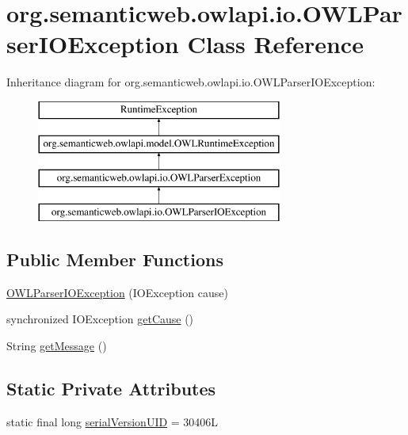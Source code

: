 \hypertarget{classorg_1_1semanticweb_1_1owlapi_1_1io_1_1_o_w_l_parser_i_o_exception}{\section{org.\-semanticweb.\-owlapi.\-io.\-O\-W\-L\-Parser\-I\-O\-Exception Class Reference}
\label{classorg_1_1semanticweb_1_1owlapi_1_1io_1_1_o_w_l_parser_i_o_exception}
}
Inheritance diagram for org.\-semanticweb.\-owlapi.\-io.\-O\-W\-L\-Parser\-I\-O\-Exception\-:\begin{figure}[H]
\begin{center}
\leavevmode
\includegraphics[height=4.000000cm]{classorg_1_1semanticweb_1_1owlapi_1_1io_1_1_o_w_l_parser_i_o_exception}
\end{center}
\end{figure}
\subsection*{Public Member Functions}
\begin{DoxyCompactItemize}
\item 
\hyperlink{classorg_1_1semanticweb_1_1owlapi_1_1io_1_1_o_w_l_parser_i_o_exception_a90b8e2fc5bef96d6669867fe3a56fdd2}{O\-W\-L\-Parser\-I\-O\-Exception} (I\-O\-Exception cause)
\item 
synchronized I\-O\-Exception \hyperlink{classorg_1_1semanticweb_1_1owlapi_1_1io_1_1_o_w_l_parser_i_o_exception_ac6a0f6ffe631550d80dce450484086eb}{get\-Cause} ()
\item 
String \hyperlink{classorg_1_1semanticweb_1_1owlapi_1_1io_1_1_o_w_l_parser_i_o_exception_a82fa38e19cffb2b64e7177cf26e6fd32}{get\-Message} ()
\end{DoxyCompactItemize}
\subsection*{Static Private Attributes}
\begin{DoxyCompactItemize}
\item 
static final long \hyperlink{classorg_1_1semanticweb_1_1owlapi_1_1io_1_1_o_w_l_parser_i_o_exception_ad26acad7b69c99f8b815e63799a3d98b}{serial\-Version\-U\-I\-D} = 30406\-L
\end{DoxyCompactItemize}


